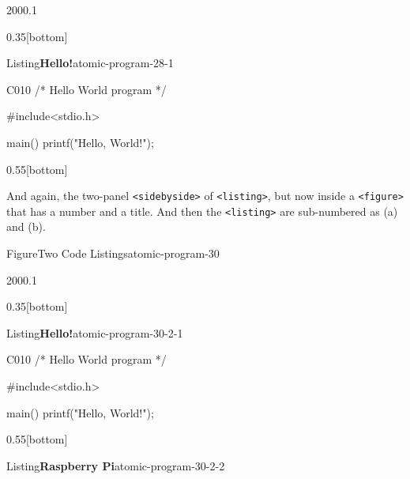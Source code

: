 \documentclass{amsart}
\theoremstyle{plain}%
\theoremstyle{definition}%
\theoremstyle{remark}%
\newcommand{\mono}[1]{\texttt{#1}}
\numberwithin{equation}{section}
\newcommand{\consoleinput}[1]{\textbf{#1}}
\begin{document}
\begin{sidebyside}{2}{0}{0}{0.1}%
\begin{sbspanel}{0.35}[bottom]%
\begin{panellistingptx}{Listing}{\textbf{Hello!}}{atomic-program-28-1}{}%
\begin{program}{C}{0}{1}{0}
/* Hello World program */

#include<stdio.h>

main()
{
    printf("Hello, World!");
}
\end{program}
\tcblower
\end{panellistingptx}%
\end{sbspanel}%
\begin{sbspanel}{0.55}[bottom]%
%
\end{sbspanel}%
\end{sidebyside}%
\par
And again, the two-panel \mono{<sidebyside>} of \mono{<listing>}, but now inside a \mono{<figure>} that has a number and a title.  And then the \mono{<listing>} are sub-numbered as (a) and (b).%
\begin{figureptx}{Figure}{Two Code Listings}{atomic-program-30}{}%
\begin{sidebyside}{2}{0}{0}{0.1}%
\begin{sbspanel}{0.35}[bottom]%
\begin{sublistingptx}{Listing}{\textbf{Hello!}}{atomic-program-30-2-1}{}%
\begin{program}{C}{0}{1}{0}
/* Hello World program */

#include<stdio.h>

main()
{
    printf("Hello, World!");
}
\end{program}
\tcblower
\end{sublistingptx}%
\end{sbspanel}%
\begin{sbspanel}{0.55}[bottom]%
\begin{sublistingptx}{Listing}{\textbf{Raspberry Pi}}{atomic-program-30-2-2}{}%
\tcblower
\end{sublistingptx}%
\end{sbspanel}%
\end{sidebyside}%
\tcblower
\end{figureptx}%
%
%
\typeout{************************************************}
\typeout{Subsection 30.4 \mono{<tabular>}}
\typeout{************************************************}
%
\end{document}
